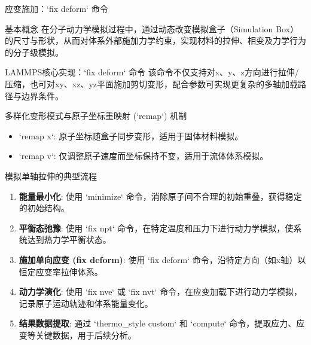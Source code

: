 \documentclass{beamer}
\begin{document}
\begin{frame}{应变施加：`fix deform` 命令}
    \begin{block}{基本概念}
        在分子动力学模拟过程中，通过动态改变模拟盒子（Simulation Box）的尺寸与形状，从而对体系外部施加力学约束，实现材料的拉伸、相变及力学行为的分子级模拟。
    \end{block}
    \begin{block}{LAMMPS核心实现：`fix deform` 命令}
        该命令不仅支持对x、y、z方向进行拉伸/压缩，也可对xy、xz、yz平面施加剪切变形，配合参数可实现更复杂的多轴加载路径与边界条件。
    \end{block}
    \begin{block}{多样化变形模式与原子坐标重映射 (`remap`) 机制}
        \begin{itemize}
            \item `remap x`: 原子坐标随盒子同步变形，适用于固体材料模拟。
            \item `remap v`: 仅调整原子速度而坐标保持不变，适用于流体体系模拟。
        \end{itemize}
    \end{block}
\end{frame}

\begin{frame}{模拟单轴拉伸的典型流程}
    \begin{enumerate}
        \item \textbf{能量最小化}: 使用 `minimize` 命令，消除原子间不合理的初始重叠，获得稳定的初始结构。
        \item \textbf{平衡态弛豫}: 使用 `fix npt` 命令，在特定温度和压力下进行动力学模拟，使系统达到热力学平衡状态。
        \item \textbf{施加单向应变 (fix deform)}: 使用 `fix deform` 命令，沿特定方向（如x轴）以恒定应变率拉伸体系。
        \item \textbf{动力学演化}: 使用 `fix nve` 或 `fix nvt` 命令，在应变加载下进行动力学模拟，记录原子运动轨迹和体系能量变化。
        \item \textbf{结果数据提取}: 通过 `thermo_style custom` 和 `compute` 命令，提取应力、应变等关键数据，用于后续分析。
    \end{enumerate}
\end{frame}
\end{document}
